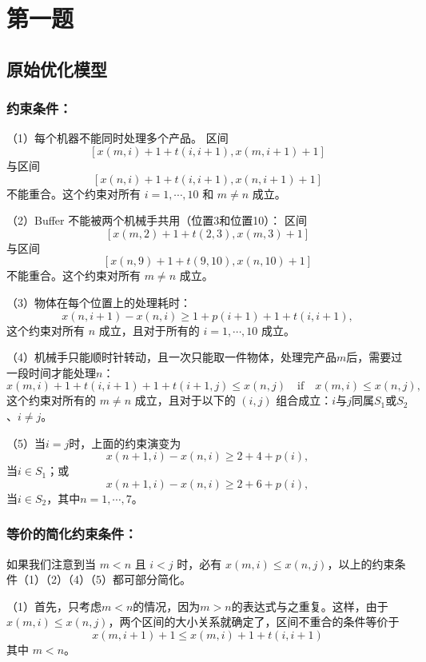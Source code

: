 \documentclass{ctexart}
\begin{document}
\section{第一题}
{

    \subsection{原始优化模型}
    {
    
        \subsubsection{约束条件：}
        {
    
            （1）每个机器不能同时处理多个产品。
            区间 $$[ x(m, i) + 1 + t(i, i+1) , x(m, i+1) + 1 ]$$ 与区间 $$[ x(n, i) + 1 + t(i, i+1) , x(n, i+1) + 1 ]$$ 不能重合。这个约束对所有 $i=1, \cdots, 10$ 和 $m \neq n$ 成立。
    
            （2）Buffer 不能被两个机械手共用（位置3和位置10）：
            区间 $$[ x(m, 2) + 1 + t(2, 3) , x(m, 3) + 1 ]$$ 与区间 $$[ x(n, 9) + 1 + t(9, 10) , x(n, 10) + 1 ]$$ 不能重合。这个约束对所有 $m \neq n$ 成立。
    
            （3）物体在每个位置上的处理耗时：
            $$x(n, i+1) - x(n, i) \geq 1 + p(i+1) + 1 + t(i, i+1),$$ 这个约束对所有 $n$ 成立，且对于所有的 $i=1, \cdots, 10$ 成立。
    
            （4）机械手只能顺时针转动，且一次只能取一件物体，处理完产品$m$后，需要过一段时间才能处理$n$：
            $$x(m, i) + 1 + t(i, i+1) + 1 + t(i+1, j) \leq x(n, j) \quad \mathrm{if} \quad x(m, i) \leq x(n, j),$$ 这个约束对所有的 $m \neq n$ 成立，且对于以下的 $(i, j)$ 组合成立：$i$与$j$同属$S_1$或$S_2$、$i\neq j$。
    
            （5）当$i=j$时，上面的约束演变为
            $$x(n+1, i) - x(n, i) \geq 2 + 4 + p(i),$$ 当$i \in S_1$；或
            $$x(n+1, i) - x(n, i) \geq 2 + 6 + p(i),$$ 当$i \in S_2$，其中$n=1, \cdots, 7$。
    
        }
    
        \subsubsection{等价的简化约束条件：}
        {
    
            如果我们注意到当 $m<n$ 且 $i<j$ 时，必有 $x(m, i) \leq x(n, j)$，以上的约束条件（1）（2）（4）（5）都可部分简化。
    
            （1）首先，只考虑$m<n$的情况，因为$m>n$的表达式与之重复。这样，由于$x(m, i) \leq x(n, j)$，两个区间的大小关系就确定了，区间不重合的条件等价于
            $$x(m, i+1) + 1 \leq x(m, i) + 1 + t(i, i+1)$$ 其中 $m < n$。
    
}}}
\end{document}
